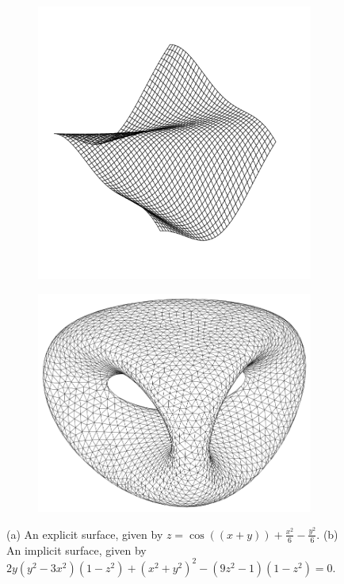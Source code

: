 \begin{figure}
  \begin{subfigure}{0.5\linewidth}
  \centering
  \includegraphics[width=0.9\linewidth]{img/m1/explicit.png}
  \caption{}
  \label{fig-explicit}
  \end{subfigure}
  \begin{subfigure}{0.5\linewidth}
    \centering
    \includegraphics[width=0.8\linewidth]{img/m1/implicit.png}
    \caption{}
  \end{subfigure}
  \caption{(a) An explicit surface, given by $z = \cos ((x+y))+\frac{x^{2}}{6}-\frac{y^{2}}{6}$. (b) An implicit surface, given by $2 y\left(y^{2}-3 x^{2}\right)\left(1-z^{2}\right)+\left(x^{2}+y^{2}\right)^{2}-\left(9 z^{2}-1\right)\left(1-z^{2}\right)=0$. }
  \label{fig-imex}
\end{figure}

